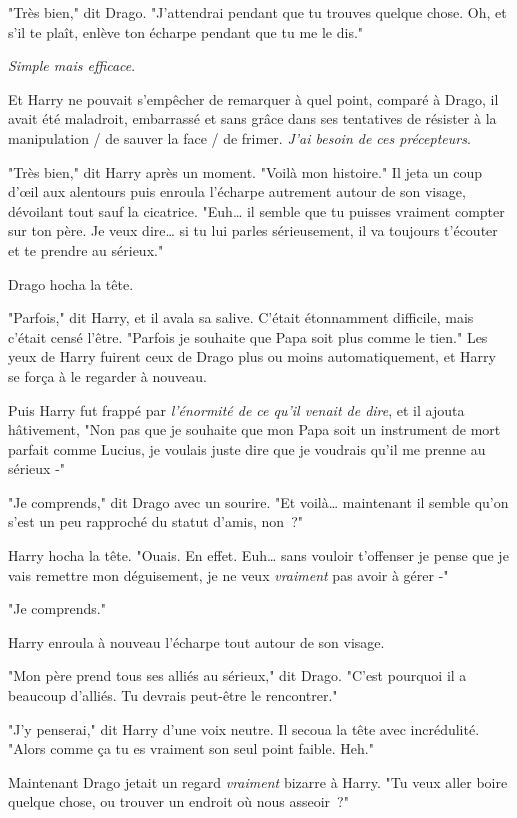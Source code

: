"Très bien," dit Drago. "J'attendrai pendant que tu trouves quelque chose. Oh, et s'il te plaît, enlève ton écharpe pendant que tu me le dis."

\emph{Simple mais efficace}.

Et Harry ne pouvait s'empêcher de remarquer à quel point, comparé à Drago, il avait été maladroit, embarrassé et sans grâce dans ses tentatives de résister à la manipulation / de sauver la face / de frimer. \emph{J'ai besoin de ces précepteurs}.

"Très bien," dit Harry après un moment. "Voilà mon histoire." Il jeta un coup d'œil aux alentours puis enroula l'écharpe autrement autour de son visage, dévoilant tout sauf la cicatrice. "Euh… il semble que tu puisses vraiment compter sur ton père. Je veux dire… si tu lui parles sérieusement, il va toujours t'écouter et te prendre au sérieux."

Drago hocha la tête.

"Parfois," dit Harry, et il avala sa salive. C'était étonnamment difficile, mais c'était censé l'être. "Parfois je souhaite que Papa soit plus comme le tien." Les yeux de Harry fuirent ceux de Drago plus ou moins automatiquement, et Harry se força à le regarder à nouveau.

Puis Harry fut frappé par \emph{l'énormité de ce qu'il venait de dire}, et il ajouta hâtivement, "Non pas que je souhaite que mon Papa soit un instrument de mort parfait comme Lucius, je voulais juste dire que je voudrais qu'il me prenne au sérieux -"

"Je comprends," dit Drago avec un sourire. "Et voilà… maintenant il semble qu'on s'est un peu rapproché du statut d'amis, non~?"

Harry hocha la tête. "Ouais. En effet. Euh… sans vouloir t'offenser je pense que je vais remettre mon déguisement, je ne veux \emph{vraiment} pas avoir à gérer -"

"Je comprends."

Harry enroula à nouveau l'écharpe tout autour de son visage.

"Mon père prend tous ses alliés au sérieux," dit Drago. "C'est pourquoi il a beaucoup d'alliés. Tu devrais peut-être le rencontrer."

"J'y penserai," dit Harry d'une voix neutre. Il secoua la tête avec incrédulité. "Alors comme ça tu es vraiment son seul point faible. Heh."

Maintenant Drago jetait un regard \emph{vraiment} bizarre à Harry. "Tu veux aller boire quelque chose, ou trouver un endroit où nous asseoir~?"

